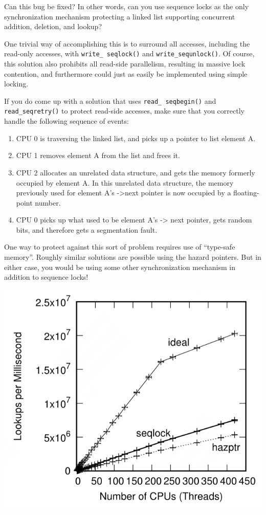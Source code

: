 \documentclass[11pt]{article}
\begin{document}
\begin{remark}[]
Can this bug be fixed? In other words, can you use sequence locks as the only synchronization
mechanism protecting a linked list supporting concurrent addition, deletion, and lookup?

One trivial way of accomplishing this is to surround all accesses, including the read-only accesses,
with \texttt{write\_ seqlock()} and \texttt{write\_sequnlock()}. Of course, this solution also prohibits all read-side
parallelism, resulting in massive lock contention, and furthermore could just as easily be implemented using
simple locking.

If you do come up with a solution that uses \texttt{read\_ seqbegin()} and \texttt{read\_seqretry()} to protect read-side
accesses, make sure that you correctly handle the following sequence of events:
\begin{enumerate}
\item CPU 0 is traversing the linked list, and picks up a pointer to list element A.
\item CPU 1 removes element A from the list and frees it.
\item CPU 2 allocates an unrelated data structure, and gets the memory formerly occupied by element A. In
this unrelated data structure, the memory previously used for element A’s ->next pointer is now
occupied by a floating-point number.
\item CPU 0 picks up what used to be element A’s -> next pointer, gets random bits, and therefore gets a
segmentation fault.
\end{enumerate}

One way to protect against this sort of problem requires use of “type-safe memory”. Roughly similar
solutions are possible using the hazard pointers. But in either case, you would be using some other
synchronization mechanism in addition to sequence locks!
\end{remark}

\begin{center}
\includegraphics[width=.8\textwidth]{../images/perfbook/5.png}
\end{center}
\end{document}
